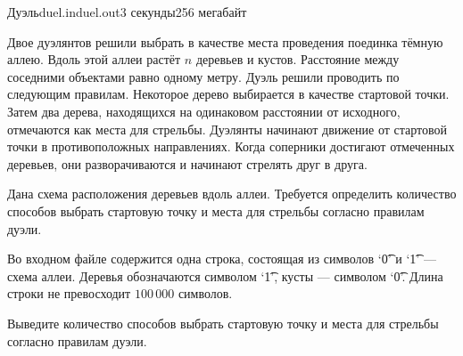 \begin{problem}{Дуэль}{duel.in}{duel.out}{3 секунды}{256 мегабайт}


Двое дуэлянтов решили выбрать в качестве места проведения поединка тёмную аллею.
Вдоль этой аллеи растёт $n$ деревьев и кустов.
Расстояние между соседними объектами равно одному метру.
Дуэль решили проводить по следующим правилам.
Некоторое дерево выбирается в качестве стартовой точки.
Затем два дерева, находящихся на одинаковом расстоянии от исходного,
отмечаются как места для стрельбы.
Дуэлянты начинают движение от стартовой точки в противоположных направлениях.
Когда соперники достигают отмеченных деревьев, они разворачиваются и начинают
стрелять друг в друга.

Дана схема расположения деревьев вдоль аллеи.
Требуется определить количество способов выбрать
стартовую точку и места для стрельбы согласно правилам дуэли.

\InputFile

Во входном файле содержится одна строка, состоящая из символов `\t{0}' и `\t{1}'
--- схема аллеи.
Деревья обозначаются символом `\t{1}', кусты --- символом `\t{0}'.
Длина строки не превосходит $100\,000$ символов.

\OutputFile

Выведите количество способов выбрать
стартовую точку и места для стрельбы согласно правилам дуэли.


\end{problem}
